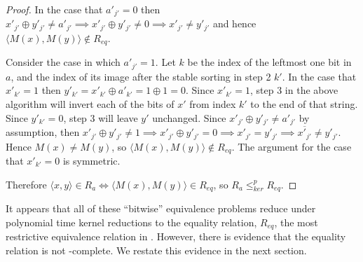 \documentclass{article}
\theoremstyle{definition} \newtheorem{definition}[definition]{Definition}
\newcommand{\kr}{\leq^{p}_{ker}} %
\newcommand{\pair}[2]{\langle#1,#2\rangle} %
\begin{document}
\begin{proof}
  In the case that $a'_{j'}=0$ then $x'_{j'}\oplus y'_{j'}\neq a'_{j'}\implies
  x'_{j'}\oplus y'_{j'}\neq 0\implies x'_{j'}\neq y'_{j'}$ and hence
  $\pair{M(x)}{M(y)}\notin R_{eq}$.

  Consider the case in which $a'_{j'}=1$. Let $k$ be the index of the leftmost
  one bit in $a$, and the index of its image after the stable sorting in step 2
  $k'$. In the case that $x'_{k'}=1$ then $y'_{k'}=x'_{k'}\oplus
  a'_{k'}=1\oplus1=0$. Since $x'_{k'}=1$, step 3 in the above algorithm will
  invert each of the bits of $x'$ from index $k'$ to the end of that
  string. Since $y'_{k'}=0$, step 3 will leave $y'$ unchanged. Since
  $x'_{j'}\oplus y'_{j'}\neq a'_{j'}$ by assumption, then $x'_{j'}\oplus
  y'_{j'}\neq 1\implies x'_{j'}\oplus y'_{j'}=0\implies x'_{j'}=y'_{j'}\implies
  \overline{x'_{j'}}\neq y'_{j'}$. Hence $M(x)\neq M(y)$, so
  $\pair{M(x)}{M(y)}\notin R_{eq}$. The argument for the case that $x'_{k'}=0$
  is symmetric.

  Therefore $\pair{x}{y}\in R_a\iff\pair{M(x)}{M(y)}\in R_{eq}$, so $R_a\kr
  R_{eq}$.
\end{proof}

It appears that all of these ``bitwise'' equivalence problems reduce under
polynomial time kernel reductions to the equality relation, $R_{eq}$, the most
restrictive equivalence relation in \PEq. However, there is evidence\cite{fg09}
that the equality relation is not \PEq-complete. We restate this evidence in
the next section.
\end{document}
